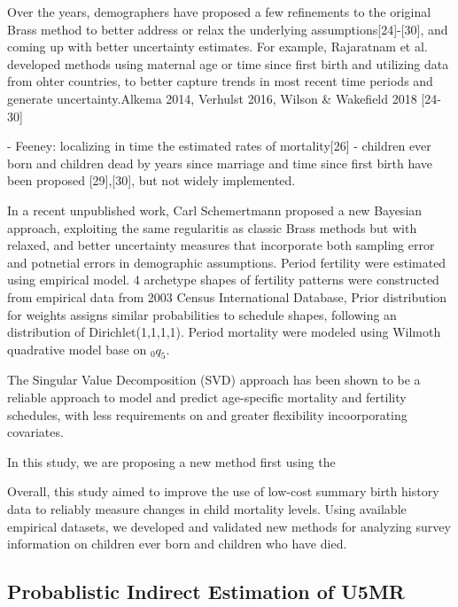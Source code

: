 \documentclass[11pt,letterpaper]{article}
\begin{document}
Over the years, demographers have proposed a few refinements to the original Brass method to better address or relax the underlying assumptions[24]-[30], and coming up with better uncertainty estimates.\cite{Rajaratnam:2010fd} For example, Rajaratnam et al. \cite{Rajaratnam:2010fd} developed methods using maternal age or time since first birth and utilizing data from ohter countries, to better capture trends in most recent time periods and generate uncertainty.Alkema 2014, Verhulst 2016,\cite{Verhulst:2017gu}  Wilson & Wakefield 2018  [24-30]

- Feeney: localizing in time the estimated rates of mortality[26]
- children ever born and children dead by years since marriage and time since first birth have been proposed [29],[30], but not widely implemented.


In a recent unpublished work,\cite{Schmertmann:2019wm} Carl Schemertmann proposed a new Bayesian approach, exploiting the same regularitis as classic Brass methods but with relaxed, and better uncertainty measures that incorporate both sampling error and potnetial errors in demographic assumptions. Period fertility were estimated using empirical model. 4 archetype shapes of fertility patterns were constructed from empirical data from 2003 Census International Database, 
Prior distribution for weights assigns similar probabilities to schedule shapes, following an distribution of Dirichlet(1,1,1,1). Period mortality were modeled using Wilmoth quadrative model base on $_0q_5$.

The Singular Value Decomposition (SVD) approach has been shown to be a reliable approach to model and predict age-specific mortality and fertility schedules, with less requirements on and greater flexibility incoorporating covariates. \cite{Clark:2015tp}

In this study, we are proposing a new method first using the 



Overall, this study aimed to improve the use of low-cost summary birth history data to reliably measure changes in child mortality levels. Using available empirical datasets, we developed and validated new methods for analyzing survey information on children ever born and children who have died.

\subsection*{Probablistic Indirect Estimation of U5MR}
\end{document}
